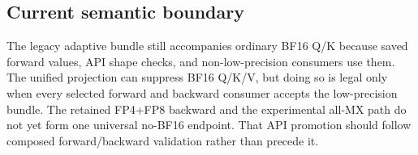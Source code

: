 \subsection{Current semantic boundary}

The legacy adaptive bundle still accompanies ordinary BF16 Q/K because saved
forward values, API shape checks, and non-low-precision consumers use them.
The unified projection can suppress BF16 Q/K/V, but doing so is legal only
when every selected forward and backward consumer accepts the low-precision
bundle.  The retained FP4+FP8 backward and the experimental all-MX path do not
yet form one universal no-BF16 endpoint.  That API promotion should follow
composed forward/backward validation rather than precede it.
